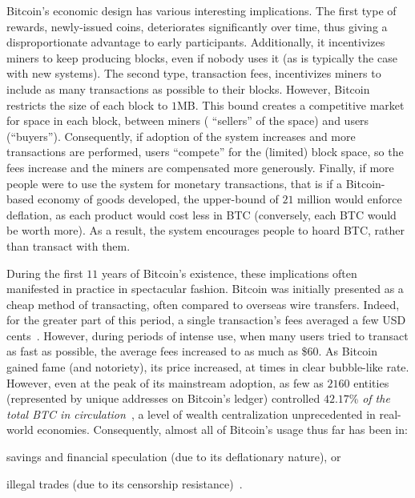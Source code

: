 Bitcoin's economic design has various interesting implications. The first type
of rewards, newly-issued coins, deteriorates significantly over time, thus
giving a disproportionate advantage to early participants.  Additionally, it
incentivizes miners to keep producing blocks, even if nobody uses it (as is
typically the case with new systems). The second type, transaction fees,
incentivizes miners to include as many transactions as possible to their
blocks. However, Bitcoin restricts the size of each block to $1$MB. This bound
creates a competitive market for space in each block, between miners (\ie
``sellers'' of the space) and users (\ie ``buyers''). Consequently, if adoption
of the system increases and more transactions are performed, users ``compete''
for the (limited) block space, so the fees increase and the miners are
compensated more generously. Finally, if more people were to use the system for
monetary transactions, that is if a Bitcoin-based economy of goods developed,
the upper-bound of $21$ million would enforce deflation, as each product would
cost less in BTC (conversely, each BTC would be worth more). As a result, the
system encourages people to hoard BTC, rather than transact with them.

During the first $11$ years of Bitcoin's existence, these implications often
manifested in practice in spectacular fashion. Bitcoin was initially
presented as a cheap method of transacting, often compared to overseas
wire transfers. Indeed, for the greater part of this period, a single
transaction's fees averaged a few USD cents~\cite{bitcoin-fees-historical}.
However, during periods of intense use, when many users tried to transact as
fast as possible, the average fees increased to as much as
\$$60$. As Bitcoin gained fame (and notoriety),
its price increased, at times in clear bubble-like rate. However, even at
the peak of its mainstream adoption, as few as $2160$ entities (represented by
unique addresses on Bitcoin's ledger) controlled $42.17$\% \emph{of the total
BTC in circulation}~\cite{bitcoin-rich-list}, a level of wealth centralization
unprecedented in real-world economies. Consequently, almost all of Bitcoin's
usage thus far has been in:
\begin{inparaenum}[i)]
    \item savings and financial speculation (due to its deflationary nature), or
    \item illegal trades (due to its censorship resistance)~\cite{gerard2017attack}.
\end{inparaenum}

